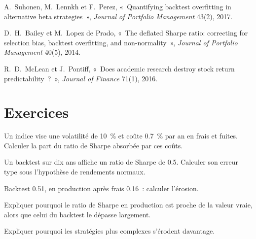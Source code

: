 \begin{omsources}
\item A.~Suhonen, M.~Lennkh et F.~Perez, «~Quantifying backtest overfitting in alternative beta strategies~», \emph{Journal of Portfolio Management}
43(2), 2017.
\item D.~H.~Bailey et M.~Lopez de Prado, «~The deflated Sharpe ratio: correcting for selection bias, backtest overfitting, and non-normality~»,
\emph{Journal of Portfolio Management} 40(5), 2014.
\item R.~D.~McLean et J.~Pontiff, «~Does academic research destroy stock return predictability~?~», \emph{Journal of Finance} 71(1), 2016.
\end{omsources}

\section{Exercices}

\begin{exercise}[$\star$]\label{exo:s2:quantitative-investment-strategies:1}
Un indice vise une volatilité de 10~\% et coûte 0.7~\% par an en frais et fuites. Calculer la part du ratio de Sharpe absorbée par ces coûts.
\end{exercise}

\begin{exercise}[$\star$]\label{exo:s2:quantitative-investment-strategies:2}
Un backtest sur dix ans affiche un ratio de Sharpe de 0.5. Calculer son erreur type sous l'hypothèse de rendements normaux.
\end{exercise}

\begin{exercise}[$\star$]\label{exo:s2:quantitative-investment-strategies:3}
Backtest 0.51, en production après frais 0.16~: calculer l'érosion.
\end{exercise}

\begin{exercise}[$\star\star$]\label{exo:s2:quantitative-investment-strategies:4}
Expliquer pourquoi le ratio de Sharpe en production est proche de la valeur vraie, alors que celui du backtest le dépasse largement.
\end{exercise}

\begin{exercise}[$\star\star$]\label{exo:s2:quantitative-investment-strategies:5}
Expliquer pourquoi les stratégies plus complexes s'érodent davantage.
\end{exercise}

